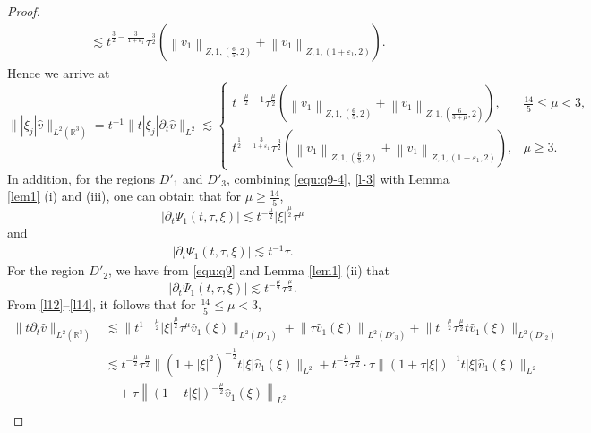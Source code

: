 \documentclass[11pt,twoside]{article}
\newcommand{\R}{\mathbb R}
\newcommand{\p}{\partial}
\newcommand{\f}{\frac}
\theoremstyle{plain}
\theoremstyle{definition}
\theoremstyle{remark}
\numberwithin{equation}{section}
\begin{document}
\begin{proof}
\begin{equation}
\begin{aligned}
& \lesssim t^{\f32-\frac{3}{1+\varepsilon_1}} \tau^{\f32}(\left\|v_1\right\|_{Z, 1, \left(\f65, 2\right)}+\left\|v_1\right\|_{Z, 1, \left(1+\varepsilon_1, 2\right)}).
\end{aligned}
\end{equation}
Hence we arrive at
\begin{equation}\label{l11}
\||\xi_j|\hat{v}\|_{L^2(\R^3)}=t^{-1}\|t|\xi_j|\p_t\hat{v}\|_{L^2}
 \lesssim\begin{cases}
 t^{-\f{\mu}{2}-1} \tau^{\f{\mu}{2}}(\left\|v_1\right\|_{Z, 1, \left(\f65, 2\right)}+\left\|v_1\right\|_{Z, 1, \left(\f{6}{3+\mu}, 2\right)}),&\f{14}{5}\leq\mu<3,\\
 t^{\f12-\frac{3}{1+\varepsilon_1}} \tau^{\f32}(\left\|v_1\right\|_{Z, 1, \left(\f65, 2\right)}+\left\|v_1\right\|_{Z, 1, \left(1+\varepsilon_1, 2\right)}),&\mu\geq3.
 \end{cases}
\end{equation}
In addition, for the regions $D'_1$ and $D'_3$,  combining \eqref{equ:q9-4}, \eqref{l-3} with Lemma \ref{lem1} (i) and (iii), one can
obtain that for $\mu\geq\f{14}{5}$,
\begin{equation}\label{l12}
\left|\p_t\Psi_1(t, \tau, \xi)\right|  \lesssim t^{-\frac{\mu}{2}}|\xi|^{\frac{\mu}{2}}\tau^{\mu}
\end{equation}
and
\begin{equation}\label{l13}
\begin{aligned}
\left|\p_t\Psi_1(t, \tau, \xi)\right|  \lesssim t^{-1}\tau.
\end{aligned}
\end{equation}
For the region $D'_2$,  we have from \eqref{equ:q9} and Lemma \ref{lem1} (ii) that
\begin{equation}\label{l14}
 \left|\p_t\Psi_1(t, \tau, \xi)\right|  \lesssim t^{-\frac{\mu}{2}}\tau^{\frac{\mu}{2}}.
\end{equation}
From \eqref{l12}--\eqref{l14}, it follows that for $\f{14}{5}\leq\mu<3$,
\begin{equation}\label{l15'}
\begin{aligned}
\|t\p_t\hat{v}\|_{L^2(\R^3)} & \lesssim\big\|t^{1-\frac{\mu}{2}} |\xi|^{\frac{\mu}{2}}\tau^{\mu} \hat{v}_1(\xi)\big\|_{L^2(D'_1)}+\left\| \tau \hat{v}_1(\xi)\right\|_{L^2(D'_3)} +\big\|t^{-\frac{\mu}{2}}\tau^{\frac{\mu}{2}} t \hat{v}_1(\xi)\big\|_{L^2(D'_2)} \\
& \lesssim t^{-\frac{\mu}{2}}\tau^{\frac{\mu}{2}}\big\| (1+|\xi|^2)^{-\f12}t|\xi|  \hat{v}_1(\xi)\big\|_{L^2}+t^{-\frac{\mu}{2}}\tau^{\frac{\mu}{2}}\cdot\tau\big\| (1+\tau|\xi|)^{-1}t|\xi|  \hat{v}_1(\xi)\big\|_{L^2}\\ &\quad +\tau\left\| (1+t|\xi|)^{-\f{\mu}{2}} \hat{v}_1(\xi)\right\|_{L^2}\\

\end{aligned}
\end{equation}
\end{proof}
\end{document}
